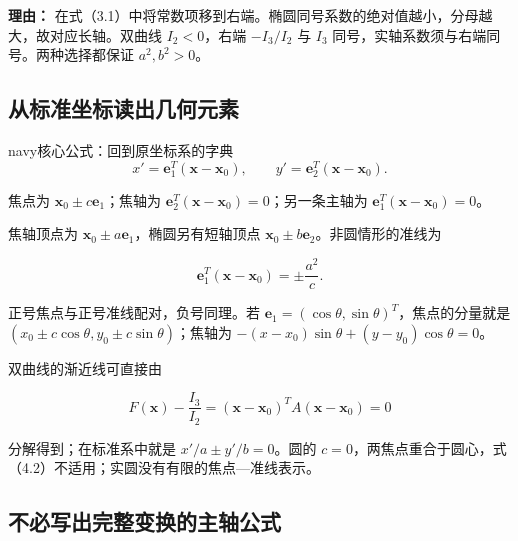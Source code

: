 \documentclass[11pt,a4paper]{article}
\begin{document}
\textbf{理由：}
在式（3.1）中将常数项移到右端。椭圆同号系数的绝对值越小，分母越大，故对应长轴。双曲线
\(I_2<0\)，右端 \(-I_3/I_2\) 与 \(I_3\)
同号，实轴系数须与右端同号。两种选择都保证 \(a^2,b^2>0\)。

\subsection{从标准坐标读出几何元素}\label{ux4eceux6807ux51c6ux5750ux6807ux8bfbux51faux51e0ux4f55ux5143ux7d20}

\begin{sboxenv}{navy}{核心公式：回到原坐标系的字典}
\begin{equation*}
x'=\boldsymbol e_1^T(\boldsymbol x-\boldsymbol x_0),\qquad y'=\boldsymbol e_2^T(\boldsymbol x-\boldsymbol x_0).\tag{4.1}
\end{equation*}

焦点为 \(\boldsymbol x_0\pm c\boldsymbol e_1\)；焦轴为
\(\boldsymbol e_2^T(\boldsymbol x-\boldsymbol x_0)=0\)；另一条主轴为
\(\boldsymbol e_1^T(\boldsymbol x-\boldsymbol x_0)=0\)。

焦轴顶点为 \(\boldsymbol x_0\pm a\boldsymbol e_1\)，椭圆另有短轴顶点
\(\boldsymbol x_0\pm b\boldsymbol e_2\)。非圆情形的准线为

\begin{equation*}
\boldsymbol e_1^T(\boldsymbol x-\boldsymbol x_0)=\pm\frac{a^2}{c}.\tag{4.2}
\end{equation*}

\end{sboxenv}

正号焦点与正号准线配对，负号同理。若
\(\boldsymbol e_1=(\cos\theta,\sin\theta)^T\)，焦点的分量就是
\((x_0\pm c\cos\theta,y_0\pm c\sin\theta)\)；焦轴为
\(-(x-x_0)\sin\theta+(y-y_0)\cos\theta=0\)。

双曲线的渐近线可直接由

\begin{equation*}
F(\boldsymbol x)-\frac{I_3}{I_2}=(\boldsymbol x-\boldsymbol x_0)^TA(\boldsymbol x-\boldsymbol x_0)=0\tag{4.3}
\end{equation*}

分解得到；在标准系中就是 \(x'/a\pm y'/b=0\)。圆的
\(c=0\)，两焦点重合于圆心，式（4.2）不适用；实圆没有有限的焦点---准线表示。

\subsection{不必写出完整变换的主轴公式}\label{ux4e0dux5fc5ux5199ux51faux5b8cux6574ux53d8ux6362ux7684ux4e3bux8f74ux516cux5f0f}
\end{document}
